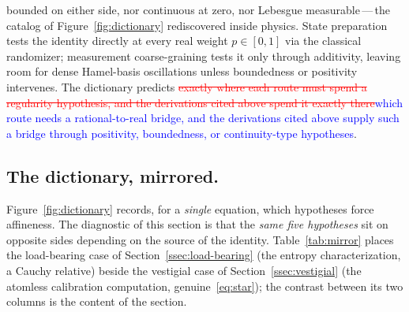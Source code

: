 \documentclass{article}
\newcommand{\ReviewAdd}[1]{\textcolor{blue}{#1}}
\newcommand{\ReviewDel}[1]{\textcolor{red}{\sout{#1}}}
\theoremstyle{plain}
\theoremstyle{definition}
\begin{document}
bounded on either side, nor continuous at zero, nor Lebesgue
measurable\,---\,the catalog of Figure~\ref{fig:dictionary}
rediscovered inside physics. State
preparation tests the identity directly at every real weight
$p\in[0,1]$ via the classical randomizer; measurement coarse-graining
tests it only through additivity, leaving room for dense Hamel-basis
oscillations unless boundedness or positivity intervenes. The dictionary
predicts \ReviewDel{exactly where each route must spend a regularity hypothesis, and the
derivations cited above spend it exactly there}\ReviewAdd{which route needs a rational-to-real bridge, and the derivations cited above supply such a bridge through positivity, boundedness, or continuity-type hypotheses}.

\subsection{The dictionary, mirrored.}
\label{ssec:mirror}

Figure~\ref{fig:dictionary} records, for a \emph{single} equation,
which hypotheses force affineness. The diagnostic of this section is
that the \emph{same five hypotheses} sit on opposite sides depending
on the source of the identity. Table~\ref{tab:mirror} places the
load-bearing case of Section~\ref{ssec:load-bearing} (the entropy
characterization, a Cauchy relative) beside the vestigial case of
Section~\ref{ssec:vestigial} (the atomless calibration computation,
genuine~\eqref{eq:star}); the contrast between its two columns is
the content of the section.
\end{document}
